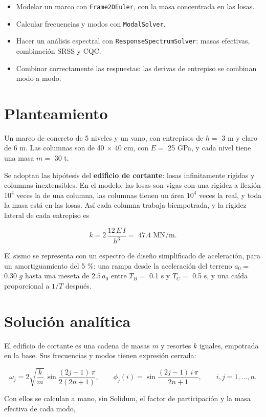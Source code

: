 \documentclass[11pt,oneside]{report}
\begin{document}
\begin{itemize}
  \item Modelar un marco con \texttt{Frame2DEuler}, con la masa concentrada en las losas.
  \item Calcular frecuencias y modos con \texttt{ModalSolver}.
  \item Hacer un análisis espectral con \texttt{ResponseSpectrumSolver}: masas efectivas, combinación SRSS y CQC.
  \item Combinar correctamente las respuestas: las derivas de entrepiso se combinan modo a modo.
\end{itemize}

\section{Planteamiento}

Un marco de concreto de 5 niveles y un vano, con entrepisos de $h =$ 3 m y claro de 6 m. Las columnas son de 40 \ensuremath{\times} 40 cm, con $E =$ 25 GPa, y cada nivel tiene una masa $m =$ 30 t.

Se adoptan las hipótesis del \textbf{edificio de cortante}: losas infinitamente rígidas y columnas inextensibles. En el modelo, las losas son vigas con una rigidez a flexión $10^{4}$ veces la de una columna, las columnas tienen un área $10^{4}$ veces la real, y toda la masa está en las losas. Así cada columna trabaja biempotrada, y la rigidez lateral de cada entrepiso es

\[
k = 2\,\frac{12\,E\,I}{h^3} = \text{ 47.4 MN/m} .
\]

El sismo se representa con un espectro de diseño simplificado de aceleración, para un amortiguamiento del 5 \%: una rampa desde la aceleración del terreno $a_0 =$ 0.30 $g$ hasta una meseta de $2.5\,a_0$ entre $T_B =$ 0.1 s y $T_C =$ 0.5 s, y una caída proporcional a $1/T$ después.

\section{Solución analítica}

El edificio de cortante es una cadena de masas $m$ y resortes $k$ iguales, empotrada en la base. Sus frecuencias y modos tienen expresión cerrada:

\[
\omega_j = 2\sqrt{\frac{k}{m}}\,\sin\frac{(2j-1)\,\pi}{2(2n+1)},
\qquad
\phi_j(i) = \sin\frac{(2j-1)\,i\,\pi}{2n+1},
\qquad i, j = 1, \dots, n .
\]

Con ellos se calculan a mano, sin Solidum, el factor de participación y la masa efectiva de cada modo,
\end{document}
